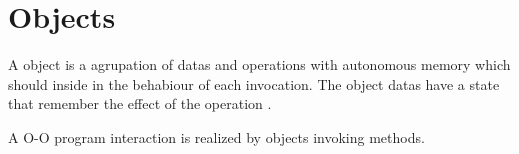 \section{Objects}

A object is a agrupation 
of datas and operations 
with autonomous memory 
which should inside 
in the behabiour of each invocation. 
The object datas have a state that remember 
the effect of the 
operation \cite{Wegner:1987}.

A O-O program interaction 
is realized by 
objects invoking methods. 

